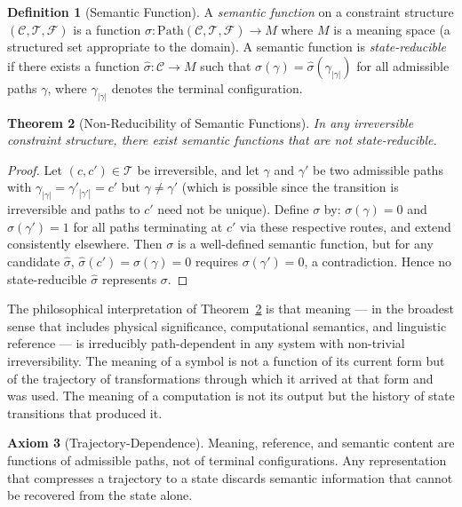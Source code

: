 \documentclass[12pt, twoside]{article}
\theoremstyle{plain}
\newtheorem{theorem}{Theorem}[section]
\theoremstyle{definition}
\newtheorem{definition}[theorem]{Definition}
\newtheorem{axiom}[theorem]{Axiom}
\theoremstyle{remark}
\newcommand{\Cfg}{\mathcal{C}}
\newcommand{\Trans}{\mathcal{T}}
\begin{document}
\begin{definition}[Semantic Function]
A \emph{semantic function} on a constraint structure
$(\Cfg, \Trans, \mathcal{F})$ is a function
$\sigma: \mathrm{Path}(\Cfg, \Trans, \mathcal{F}) \to M$
where $M$ is a meaning space (a structured set appropriate to the domain).
A semantic function is \emph{state-reducible} if there exists a function
$\hat{\sigma}: \Cfg \to M$ such that
$\sigma(\gamma) = \hat{\sigma}(\gamma_{|\gamma|})$
for all admissible paths $\gamma$,
where $\gamma_{|\gamma|}$ denotes the terminal configuration.
\end{definition}

\begin{theorem}[Non-Reducibility of Semantic Functions]
\label{thm:semantic}
In any irreversible constraint structure, there exist semantic functions
that are not state-reducible.
\end{theorem}

\begin{proof}
Let $(c, c') \in \Trans$ be irreversible, and let $\gamma$ and $\gamma'$
be two admissible paths with $\gamma_{|\gamma|} = \gamma'_{|\gamma'|} = c'$
but $\gamma \neq \gamma'$ (which is possible since the transition is
irreversible and paths to $c'$ need not be unique).
Define $\sigma$ by: $\sigma(\gamma) = 0$ and $\sigma(\gamma') = 1$
for all paths terminating at $c'$ via these respective routes,
and extend consistently elsewhere.
Then $\sigma$ is a well-defined semantic function, but for any candidate
$\hat{\sigma}$, $\hat{\sigma}(c') = \sigma(\gamma) = 0$
requires $\sigma(\gamma') = 0$, a contradiction.
Hence no state-reducible $\hat{\sigma}$ represents $\sigma$.
\end{proof}

The philosophical interpretation of Theorem~\ref{thm:semantic}
is that meaning — in the broadest sense that includes physical significance,
computational semantics, and linguistic reference — is irreducibly
path-dependent in any system with non-trivial irreversibility.
The meaning of a symbol is not a function of its current form
but of the trajectory of transformations through which it arrived
at that form and was used.
The meaning of a computation is not its output but the history of
state transitions that produced it.

\begin{axiom}[Trajectory-Dependence]
\label{ax:traj}
Meaning, reference, and semantic content are functions of admissible paths,
not of terminal configurations.
Any representation that compresses a trajectory to a state
discards semantic information that cannot be recovered from the state alone.
\end{axiom}
\end{document}
